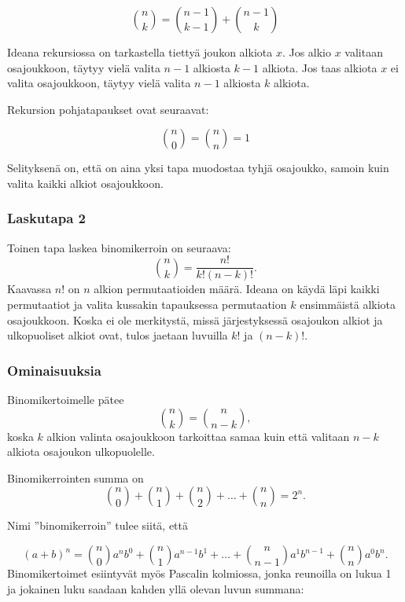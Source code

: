 \[
{n \choose k}  =  {n-1 \choose k-1} + {n-1 \choose k}
\]

Ideana rekursiossa on tarkastella tiettyä
joukon alkiota $x$.
Jos alkio $x$ valitaan osajoukkoon,
täytyy vielä valita $n-1$ alkiosta $k-1$ alkiota.
Jos taas alkiota $x$ ei valita osajoukkoon,
täytyy vielä valita $n-1$ alkiosta $k$ alkiota.

Rekursion pohjatapaukset ovat seuraavat:

\[
{n \choose 0}  =  {n \choose n} = 1
\]

Selityksenä on, että on aina yksi tapa
muodostaa tyhjä osajoukko,
samoin kuin valita kaikki alkiot osajoukkoon.

\subsubsection{Laskutapa 2}

Toinen tapa laskea binomikerroin on seuraava:
\[
{n \choose k}  =  \frac{n!}{k!(n-k)!}.
\]
Kaavassa $n!$ on $n$ alkion permutaatioiden määrä.
Ideana on käydä läpi kaikki permutaatiot
ja valita kussakin tapauksessa
permutaation $k$ ensimmäistä alkiota osajoukkoon.
Koska ei ole merkitystä,
missä järjestyksessä osajoukon alkiot
ja ulkopuoliset alkiot ovat,
tulos jaetaan luvuilla $k!$ ja $(n-k)!$.

\subsubsection{Ominaisuuksia}

Binomikertoimelle pätee
\[
{n \choose k}  =  {n \choose n-k},
\]
koska $k$ alkion valinta osajoukkoon
tarkoittaa samaa kuin että valitaan
$n-k$ alkiota osajoukon ulkopuolelle.

Binomikerrointen summa on
\[
{n \choose 0}+{n \choose 1}+{n \choose 2}+\ldots+{n \choose n}=2^n.
\]

Nimi ''binomikerroin'' tulee siitä, että

\[ (a+b)^n =
{n \choose 0} a^n b^0 + 
{n \choose 1} a^{n-1} b^1 +
\ldots + 
{n \choose n-1} a^1 b^{n-1} +
{n \choose n} a^0 b^n. \]
Binomikertoimet esiintyvät myös Pascalin
kolmiossa, jonka reunoilla on lukua 1
ja jokainen luku saadaan
kahden yllä olevan luvun summana:
\begin{center}
\end{center}

